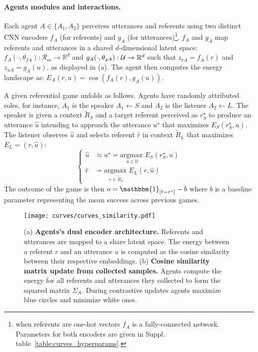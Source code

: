 \paragraph{Agents modules and interactions. } Each agent $A\in\{A_1,A_2\}$ perceives utterances and referents using two distinct CNN encoders $f_A$ (for referents) and $g_A$ (for utterances)\footnote{when referents are one-hot vectors $f_A$ is a fully-connected network. Parameters for both encoders are given in Suppl. table~\ref{table:curves_hyperparams}.}. $f_A$ and $g_A$ map referents and utterances in a shared $d$-dimensional latent space: $f_A(\cdot,\theta_{fA}): \mathcal{R}_m \rightarrow \mathbb{R}^d$ and $g_A(\cdot,\theta_{gA}): \mathcal{U} \rightarrow  \mathbb{R}^d$ such that $z_{rA}=f_A(r)$ and $z_{uA}=g_A(u)$, as displayed in (a). The agent then computes the energy landscape as: $E_A(r,u) = \cos(f_A(r),g_A(u))$.

A given referential game unfolds as follows. Agents have randomly attributed roles, for instance, $A_1$ is the speaker $A_1\leftarrow S$ and $A_2$ is the listener $A_2 \leftarrow L$. The speaker is given a context $\tilde{R}_S$ and a target referent perceived as $r^\star_S$ to produce an utterance $\hat{u}$ intending to approach the utterance $u^\star$ that maximizes $E_S(r^\star_S,u)$. The listener observes $\hat{u}$ and selects referent $\hat{r}$ in context $\tilde{R}_L$ that maximizes $E_L=(r,\hat{u})$:
\begin{equation}
\left\{
\begin{split}
    \hat{u} &\approx u^\star= \underset{u \in \mathcal{U}}{\textrm{argmax }} E_S(r^\star_S,u) \\
    \hat{r} &= \underset{r \in \tilde{R}_L}{\textrm{argmax }} E_L(r,\hat{u}) \end{split}
\right.
\label{eq:ut_gen_ref_sel}
\end{equation}
The outcome of the game is then $o = \mathbbm{1}_{[\hat{r}=r^\star]} - b$ where $b$ is a baseline parameter representing the mean success across previous games. 


\begin{figure}[h!]
\centering 
\texttt{[image: curves/curves\_similarity.pdf]}
\caption{(a) \textbf{Agents's dual encoder architecture.} Referents and utterances are mapped to a share latent space. The energy between a referent $r$ and an utterance $u$ is computed as the cosine similarity between their respective embeddings. (b) \textbf{Cosine similarity matrix update from collected samples.} Agents compute the energy for all referents and utterances they collected to form the squared matrix $\Sigma_A$. During contrastive updates agents maximize blue circles and minimize white ones.}
\label{fig:curves_encoders}
\end{figure}

